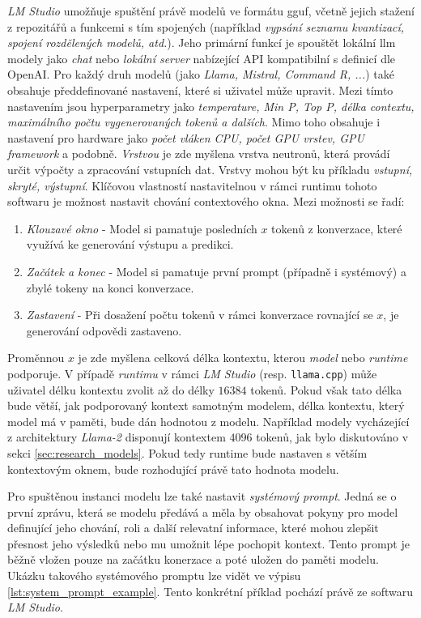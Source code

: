\documentclass[czech, ma, kiv, he, iso690alph, pdf, viewonly]{fasthesis}
\begin{document}
            \textit{LM Studio} umožňuje spuštění právě modelů ve formátu \acrshort{gguf}, včetně jejich stažení z repozitářů a funkcemi s tím spojených (například \textit{vypsání seznamu kvantizací, spojení rozdělených modelů, atd.}). Jeho primární funkcí je spouštět lokální \Gls{llm} modely jako \textit{chat} nebo \textit{lokální server} nabízející API kompatibilní s definicí dle OpenAI. Pro každý druh modelů (jako \textit{Llama, Mistral, Command R, ...}) také obsahuje předdefinované nastavení, které si uživatel může upravit. Mezi tímto nastavením jsou hyperparametry jako \textit{\gls{temperature}, Min P, Top P, délka \gls{context}u, maximálního počtu vygenerovaných \gls{token}ů a dalších}. Mimo toho obsahuje i nastavení pro hardware jako \textit{počet vláken CPU, počet GPU vrstev, GPU framework} a podobně. \textit{Vrstvou} je zde myšlena vrstva neutronů, která provádí určit výpočty a zpracování vstupních dat. Vrstvy mohou být ku příkladu \textit{vstupní, skryté, výstupní}. Klíčovou vlastností nastavitelnou v rámci runtimu tohoto softwaru je možnost nastavit chování \gls{context}ového okna. Mezi možnosti se řadí: 
            \begin{enumerate}
                \item \textit{Klouzavé okno} - Model si pamatuje posledních \(x\) tokenů z konverzace, které využívá ke generování výstupu a predikci.
                \item \textit{Začátek a konec} - Model si pamatuje první prompt (případně i systémový) a zbylé tokeny na konci konverzace.
                \item \textit{Zastavení} - Při dosažení počtu tokenů v rámci konverzace rovnající se \(x\), je generování odpovědi zastaveno.
            \end{enumerate}
            Proměnnou \(x\) je zde myšlena celková délka kontextu, kterou \textit{model} nebo \textit{runtime} podporuje. V případě \textit{runtimu} v rámci \textit{LM Studio} (resp. \verb|llama.cpp|) může uživatel délku kontextu zvolit až do délky \(16 384\) \gls{token}ů. Pokud však tato délka bude větší, jak podporovaný kontext samotným modelem, délka kontextu, který model má v paměti, bude dán hodnotou z modelu. Například modely vycházející z architektury \textit{Llama-2} disponují kontextem \(4096\) \gls{token}ů, jak bylo diskutováno v sekci \ref{sec:research_models}. Pokud tedy runtime bude nastaven s větším kontextovým oknem, bude rozhodující právě tato hodnota modelu.
            
            Pro spuštěnou instanci modelu lze také nastavit \textit{systémový prompt}. Jedná se o první zprávu, která se modelu předává a měla by obsahovat pokyny pro model definující jeho chování, roli a další relevatní informace, které mohou zlepšit přesnost jeho výsledků nebo mu umožnit lépe pochopit kontext. Tento prompt je běžně vložen pouze na začátku konerzace a poté uložen do paměti modelu. Ukázku takového systémového promptu lze vidět ve výpisu \ref{lst:system_prompt_example}. Tento konkrétní příklad pochází právě ze softwaru \textit{LM Studio}.
\end{document}
